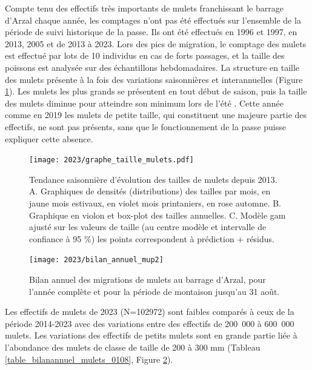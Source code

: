 \documentclass[11pt,twocolumn,titlepage,twoside]{article}\usepackage[]{graphicx}\usepackage[]{color}
\begin{document}
Compte tenu des effectifs très importants de mulets franchissant le barrage
d'Arzal chaque année, les comptages n'ont pas été effectués sur l'ensemble de la
période de suivi historique de la passe. Ils ont été effectués en 1996 et
1997, en 2013, 2005 et de 2013 à 2023. Lors des pics de migration, le comptage
des mulets est effectué par lots de 10 individus en cas de forts passages, et la taille des poissons est analysée
sur des échantillons hebdomadaires.
La structure en
taille des mulets présente à la fois des variations saisonnières et
interannuelles (Figure \ref{figure_taille_mulets}). Les mulets les plus grands
se présentent en tout début de saison, puis la taille des mulets diminue pour
atteindre son minimum lors de l'été \citep{lemonnier_dynamique_2019}.
Cette année comme en 2019 les mulets de petite taille, qui constituent une
majeure partie des effectifs, ne sont pas présents, sans que le fonctionnement
de la passe puisse expliquer cette absence.

\begin{figure}[htpb]
\centering
\texttt{[image: 2023/graphe\_taille\_mulets.pdf]} 
\caption{Tendance saisonnière d'évolution des
tailles de mulets depuis 2013. A. Graphiques de densités (distributions) des
tailles par mois, en jaune mois estivaux, en violet mois printaniers, en rose
automne. B. Graphique en violon et box-plot des tailles annuelles. C. Modèle gam
ajusté sur les valeurs de taille (au centre modèle et intervalle de confiance
 à 95 \%) les points correspondent à prédiction + résidus.}
\label{figure_taille_mulets}
\end{figure}



\begin{figure}[htpb]
\centering
\texttt{[image: 2023/bilan\_annuel\_mup2]} 
\caption{Bilan annuel des migrations de mulets au barrage d'Arzal, pour
l’année complète et pour la période de montaison jusqu’au 31 août.}
\label{bilan_annuel_mup}
\end{figure}

Les effectifs de mulets de 2023
(N=102972) 
sont faibles comparés à ceux de la période 2014-2023 avec des variations entre
des effectifs de 200~000 à 600~000 mulets.
Les variations des effectifs de petits mulets sont en 
grande partie liée à l'abondance des mulets de classe de taille de 200 à 300 mm
\citep{lemonnier_dynamique_2019} (Tableau \ref{table_bilanannuel_mulets_0108}, Figure
\ref{bilan_annuel_mup}).
\end{document}
